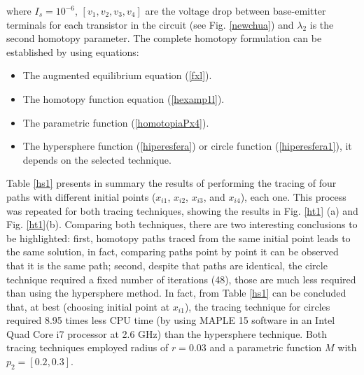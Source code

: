 \documentclass[conference,letterpaper,onecolumn]{IEEEtran}
\begin{document}
where $I_s=10^{-6}$,  $[v_1,v_2,v_3, v_4]$ are the voltage drop between base-emitter terminals for each transistor in the circuit (see Fig. \ref{newchua}) and $\lambda_2$ is the second homotopy parameter. The complete homotopy formulation can be established by using equations:

\begin{itemize}
\item The augmented equilibrium equation (\ref{fxl}).
\item The homotopy function equation (\ref{hexamp1l}).
\item The parametric function (\ref{homotopiaPx4}).
\item The hypersphere function (\ref{hiperesfera}) or circle function (\ref{hiperesfera1}), it depends on the selected technique.
\end{itemize}

Table \ref{hs1} presents in summary the results of performing the tracing of four paths with different initial points ($x_{i1}$, $x_{i2}$, $x_{i3}$, and $x_{i4}$), each one. This process was repeated for both tracing techniques, showing the results in Fig. \ref{ht1} (a) and Fig. \ref{ht1}(b). Comparing both techniques, there are two interesting conclusions to be highlighted: first, homotopy paths traced from the same initial point leads to the same solution, in fact, comparing paths point by point it can be observed that it is the same path; second, despite that paths are identical, the circle technique required a fixed number of iterations (48), those are much less required than using the hypersphere method. In fact, from Table \ref{hs1} can be concluded that, at best (choosing initial point at $x_{i1}$), the tracing technique for circles required 8.95 times less CPU time (by using MAPLE 15 software in an Intel Quad Core i7 processor at 2.6 GHz) than the hypersphere technique. Both tracing techniques employed radius of $r=0.03$ and a parametric function $M$ with $p_2=[0.2,0.3]$.
\end{document}
